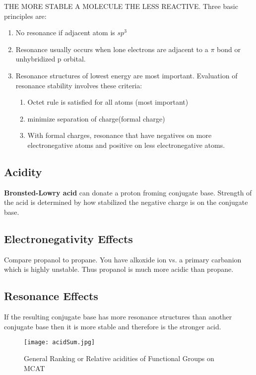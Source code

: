 \documentclass[../OChemReview.tex]{subfiles}
\begin{document}
  THE MORE STABLE A MOLECULE THE LESS REACTIVE. Three basic principles are:
  \begin{enumerate}
    \item No resonance if adjacent atom is $ sp^{3} $
    \item Resonance usually occurs when lone electrons are adjacent to a $ \pi $
      bond or unhybridized p orbital.
    \item Resonance structures of lowest energy are most important. Evaluation
      of resonance stability involves these criteria:
      \begin{enumerate}
        \item Octet rule is satisfied for all atoms (most important)
        \item minimize separation of charge(formal charge)
        \item With formal charges, resonance that have negatives on more
          electronegative atoms and positive on less electronegative atoms.
      \end{enumerate}
  \end{enumerate}

  \subsection{Acidity}

  \textbf{Bronsted-Lowry acid} can donate a proton froming conjugate base.
  Strength of the acid is determined by how stabilized the negative charge is on
  the conjugate base.

  \subsection{Electronegativity Effects }

  Compare propanol to propane. You have alkoxide ion vs. a primary carbanion
  which is highly unstable. Thus propanol is much more acidic than propane.

  \subsection{Resonance Effects}

  If the resulting conjugate base has more resonance structures than another
  conjugate base then it is more stable and therefore is the stronger acid.
  \begin{figure}[H]
    \centering
    \texttt{[image: acidSum.jpg]}
    \caption{General Ranking or Relative acidities of Functional Groups on MCAT}
  \end{figure}
  
\end{document}
